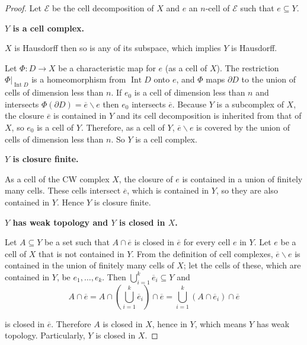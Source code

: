 \begin{proof}
	Let \( \mathscr{E} \) be the cell decomposition of \( X \) and \( e \) an \( n \)-cell of \( \mathscr{E} \) such that \( e \subseteq Y \).

	\textbf{\( Y \) is a cell complex.}

	\( X \) is Hausdorff then so is any of its subspace, which implies \( Y \) is Hausdorff.

	Let \( \Phi: D \to X \) be a characteristic map for \( e \) (as a cell of \( X \)). The restriction \( \Phi\vert_{\operatorname{Int}D} \) is a homeomorphism from \( \operatorname{Int}D \) onto \( e \), and \( \Phi \) maps \( \partial D \) to the union of cells of dimension less than \( n \). If \( e_{0} \) is a cell of dimension less than \( n \) and intersects \( \Phi(\partial D) = \overline{e}\smallsetminus e \) then \( e_{0} \) intersects \( \overline{e} \). Because \( Y \) is a subcomplex of \( X \), the closure \( \overline{e} \) is contained in \( Y \) and its cell decomposition is inherited from that of \( X \), so \( e_{0} \) is a cell of \( Y \). Therefore, as a cell of \( Y \), \( \overline{e}\smallsetminus e \) is covered by the union of cells of dimension less than \( n \). So \( Y \) is a cell complex.

	\textbf{\( Y \) is closure finite.}

	As a cell of the CW complex \( X \), the closure of \( e \) is contained in a union of finitely many cells. These cells intersect \( \overline{e} \), which is contained in \( Y \), so they are also contained in \( Y \). Hence \( Y \) is closure finite.

	\textbf{\( Y \) has weak topology and \( Y \) is closed in \( X \).}

	Let \( A \subseteq Y \) be a set such that \( A\cap \overline{e} \) is closed in \( \overline{e} \) for every cell \( e \) in \( Y \). Let \( e \) be a cell of \( X \) that is not contained in \( Y \). From the definition of cell complexes, \( \overline{e}\smallsetminus e \) is contained in the union of finitely many cells of \( X \); let the cells of these, which are contained in \( Y \), be \( e_{1}, \ldots, e_{k} \). Then \( \bigcup^{k}_{i=1}\overline{e}_{i} \subseteq Y \) and
	\[
		A \cap \overline{e} = A \cap \left(\bigcup^{k}_{i=1}\overline{e}_{i}\right) \cap \overline{e} = \bigcup^{k}_{i=1}(A\cap \overline{e}_{i}) \cap \overline{e}
	\]

	is closed in \( \overline{e} \). Therefore \( A \) is closed in \( X \), hence in \( Y \), which means \( Y \) has weak topology. Particularly, \( Y \) is closed in \( X \).
\end{proof}

